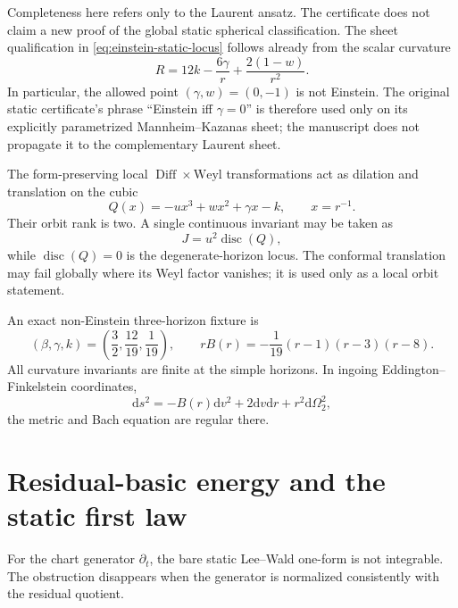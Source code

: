 \documentclass[11pt]{article}
\theoremstyle{definition}
\theoremstyle{remark}
\newcommand{\dd}{\mathrm d}
\newcommand{\Diff}{\operatorname{Diff}}
\begin{document}
Completeness here refers only to the Laurent ansatz.  The certificate does
not claim a new proof of the global static spherical classification.  The
sheet qualification in \eqref{eq:einstein-static-locus} follows already from
the scalar curvature
\begin{equation}
 R=12k-\frac{6\gamma}{r}+\frac{2(1-w)}{r^2}.
\end{equation}
In particular, the allowed point \((\gamma,w)=(0,-1)\) is not Einstein.
The original static certificate's phrase ``Einstein iff \(\gamma=0\)'' is
therefore used only on its explicitly parametrized Mannheim--Kazanas sheet;
the manuscript does not propagate it to the complementary Laurent sheet.

The form-preserving local \(\Diff\times\mathrm{Weyl}\) transformations act
as dilation and translation on the cubic
\[
 Q(x)=-ux^3+wx^2+\gamma x-k,\qquad x=r^{-1}.
\]
Their orbit rank is two.  A single continuous invariant may be taken as
\[
 J=u^2\operatorname{disc}(Q),
\]
while \(\operatorname{disc}(Q)=0\) is the degenerate-horizon locus.
The conformal translation may fail globally where its Weyl factor vanishes;
it is used only as a local orbit statement.

An exact non-Einstein three-horizon fixture is
\[
 (\beta,\gamma,k)=\left(\frac32,\frac{12}{19},\frac1{19}\right),
 \qquad
 rB(r)=-\frac1{19}(r-1)(r-3)(r-8).
\]
All curvature invariants are finite at the simple horizons.  In ingoing
Eddington--Finkelstein coordinates,
\[
 \dd s^2=-B(r)\dd v^2+2\dd v\dd r+r^2\dd\Omega_2^2,
\]
the metric and Bach equation are regular there.

\section{Residual-basic energy and the static first law}

For the chart generator \(\partial_t\), the bare static Lee--Wald one-form
is not integrable.  The obstruction disappears when the generator is
normalized consistently with the residual quotient.
\end{document}
